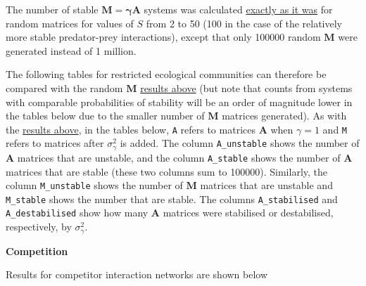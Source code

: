\documentclass[]{article}
\begin{document}
The number of stable \(\mathbf{M = \gamma A}\) systems was calculated
\protect\hyperlink{IncrS}{exactly as it was} for random matrices for
values of \(S\) from 2 to 50 (100 in the case of the relatively more
stable predator-prey interactions), except that only 100000 random
\(\mathbf{M}\) were generated instead of 1 million.

The following tables for restricted ecological communities can therefore
be compared with the random \(\mathbf{M}\)
\protect\hyperlink{IncrS}{results above} (but note that counts from
systems with comparable probabilities of stability will be an order of
magnitude lower in the tables below due to the smaller number of
\(\mathbf{M}\) matrices generated). As with the
\protect\hyperlink{IncrS}{results above}, in the tables below,
\texttt{A} refers to matrices \(\mathbf{A}\) when \(\gamma = 1\) and
\texttt{M} refers to matrices after \(\sigma^{2}_{\gamma}\) is added.
The column \texttt{A\_unstable} shows the number of \(\mathbf{A}\)
matrices that are unstable, and the column \texttt{A\_stable} shows the
number of \(\mathbf{A}\) matrices that are stable (these two columns sum
to 100000). Similarly, the column \texttt{M\_unstable} shows the number
of \(\mathbf{M}\) matrices that are unstable and \texttt{M\_stable}
shows the number that are stable. The columns \texttt{A\_stabilised} and
\texttt{A\_destabilised} show how many \(\mathbf{A}\) matrices were
stabilised or destabilised, respectively, by \(\sigma^{2}_{\gamma}\).

\textbf{Competition}

Results for competitor interaction networks are shown below
\end{document}

